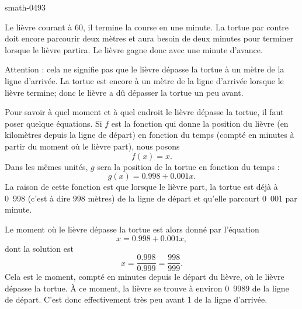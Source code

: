 
\begin{corrige}{smath-0493}

    Le lièvre courant à \unit{60}{\kilo\meter\per\hour}, il termine la course en une minute. La tortue par contre doit encore parcourir deux mètres et aura besoin de deux minutes pour terminer lorsque le lièvre partira. Le lièvre gagne donc avec une minute d'avance.

    Attention : cela ne signifie pas que le lièvre dépasse la tortue à un mètre de la ligne d'arrivée. La tortue est encore à un mètre de la ligne d'arrivée lorsque le lièvre termine; donc le lièvre a dû dépasser la tortue un peu avant.

    Pour savoir à quel moment et à quel endroit le lièvre dépasse la tortue, il faut poser quelque équations. Si \( f\) est la fonction qui donne la position du lièvre (en kilomètres depuis la ligne de départ) en fonction du temps (compté en minutes à partir du moment où le lièvre part), nous posons
    \begin{equation}
        f(x)=x.
    \end{equation}
    Dans les mêmes unités, \( g\) sera la position de la tortue en fonction du temps :
    \begin{equation}
        g(x)=0.998+0.001x.
    \end{equation}
    La raison de cette fonction est que lorsque le lièvre part, la tortue est déjà à \unit{0.998}{\kilo\meter} (c'est à dire \( 998\) mètres) de la ligne de départ et qu'elle parcourt \unit{0.001}{\kilo\meter} par minute.

    Le moment où le lièvre dépasse la tortue est alors donné par l'équation
    \begin{equation}
        x=0.998+0.001x,
    \end{equation}
    dont la solution est
    \begin{equation}
        x=\frac{ 0.998 }{ 0.999 }=\frac{ 998 }{ 999 }.
    \end{equation}
    Cela est le moment, compté en minutes depuis le départ du lièvre, où le lièvre dépasse la tortue. À ce moment, la lièvre se trouve à environ \unit{0.9989}{\kilo\meter} de la ligne de départ. C'est donc effectivement très peu avant \unit{1}{\meter} de la ligne d'arrivée.

\end{corrige}
